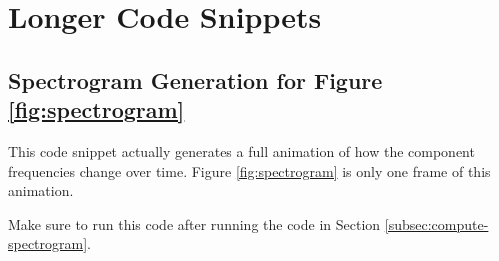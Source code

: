 
\chapter{Longer Code Snippets} %
\label{appendix:code} %

\section{Spectrogram Generation for Figure \ref{fig:spectrogram}}
\label{sec:code-spectrogram}
This code snippet actually generates a full animation of how the component frequencies change over time.
Figure \ref{fig:spectrogram} is only one frame of this animation.

Make sure to run this code after running the code in Section \ref{subsec:compute-spectrogram}.
